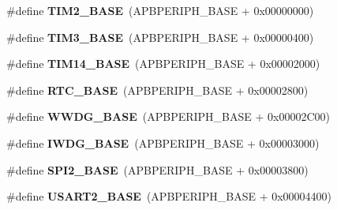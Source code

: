 \begin{DoxyCompactItemize}
\item 
\mbox{\label{group___peripheral__memory__map_ga00d0fe6ad532ab32f0f81cafca8d3aa5}} 
\#define {\bfseries T\+I\+M2\+\_\+\+B\+A\+SE}~(A\+P\+B\+P\+E\+R\+I\+P\+H\+\_\+\+B\+A\+SE + 0x00000000)
\item 
\mbox{\label{group___peripheral__memory__map_gaf0c34a518f87e1e505cd2332e989564a}} 
\#define {\bfseries T\+I\+M3\+\_\+\+B\+A\+SE}~(A\+P\+B\+P\+E\+R\+I\+P\+H\+\_\+\+B\+A\+SE + 0x00000400)
\item 
\mbox{\label{group___peripheral__memory__map_ga862855347d6e1d92730dfe17ee8e90b8}} 
\#define {\bfseries T\+I\+M14\+\_\+\+B\+A\+SE}~(A\+P\+B\+P\+E\+R\+I\+P\+H\+\_\+\+B\+A\+SE + 0x00002000)
\item 
\mbox{\label{group___peripheral__memory__map_ga4265e665d56225412e57a61d87417022}} 
\#define {\bfseries R\+T\+C\+\_\+\+B\+A\+SE}~(A\+P\+B\+P\+E\+R\+I\+P\+H\+\_\+\+B\+A\+SE + 0x00002800)
\item 
\mbox{\label{group___peripheral__memory__map_ga9a5bf4728ab93dea5b569f5b972cbe62}} 
\#define {\bfseries W\+W\+D\+G\+\_\+\+B\+A\+SE}~(A\+P\+B\+P\+E\+R\+I\+P\+H\+\_\+\+B\+A\+SE + 0x00002\+C00)
\item 
\mbox{\label{group___peripheral__memory__map_ga8543ee4997296af5536b007cd4748f55}} 
\#define {\bfseries I\+W\+D\+G\+\_\+\+B\+A\+SE}~(A\+P\+B\+P\+E\+R\+I\+P\+H\+\_\+\+B\+A\+SE + 0x00003000)
\item 
\mbox{\label{group___peripheral__memory__map_gac3e357b4c25106ed375fb1affab6bb86}} 
\#define {\bfseries S\+P\+I2\+\_\+\+B\+A\+SE}~(A\+P\+B\+P\+E\+R\+I\+P\+H\+\_\+\+B\+A\+SE + 0x00003800)
\item 
\mbox{\label{group___peripheral__memory__map_gade83162a04bca0b15b39018a8e8ec090}} 
\#define {\bfseries U\+S\+A\+R\+T2\+\_\+\+B\+A\+SE}~(A\+P\+B\+P\+E\+R\+I\+P\+H\+\_\+\+B\+A\+SE + 0x00004400)
\item 
\mbox{\label{group___peripheral__memory__map_gacd72dbffb1738ca87c838545c4eb85a3}} 

\end{DoxyCompactItemize}
